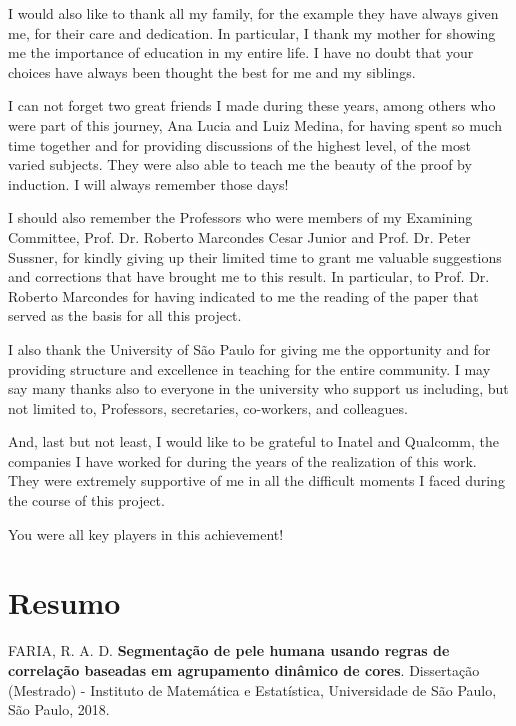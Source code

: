 \documentclass[12pt,twoside,a4paper]{book}
\theoremstyle{plain}
\theoremstyle{definition}
\begin{document}
I would also like to thank all my family, for the example they have always given me, for their care and dedication. In particular, I thank my mother for showing me the importance of education in my entire life. I have no doubt that your choices have always been thought the best for me and my siblings.

I can not forget two great friends I made during these years, among others who were part of this journey, Ana Lucia and Luiz Medina, for having spent so much time together and for providing discussions of the highest level, of the most varied subjects. They were also able to teach me the beauty of the proof by induction. I will always remember those days!

I should also remember the Professors who were members of my Examining Committee, Prof. Dr. Roberto Marcondes Cesar Junior and Prof. Dr. Peter Sussner, for kindly giving up their limited time to grant me valuable suggestions and corrections that have brought me to this result. In particular, to Prof. Dr. Roberto Marcondes for having indicated to me the reading of the paper that served as the basis for all this project.

I also thank the University of São Paulo for giving me the opportunity and for providing structure and excellence in teaching for the entire community. I may say many thanks also to everyone in the university who support us including, but not limited to, Professors, secretaries, co-workers, and colleagues.

And, last but not least, I would like to be grateful to Inatel and Qualcomm, the companies I have worked for during the years of the realization of this work. They were extremely supportive of me in all the difficult moments I faced during the course of this project.

You were all key players in this achievement!


\chapter*{Resumo}

\noindent FARIA, R. A. D. \textbf{Segmentação de pele humana usando regras de correlação baseadas em agrupamento dinâmico de cores}.
Dissertação (Mestrado) - Instituto de Matemática e Estatística,
Universidade de São Paulo, São Paulo, 2018.
\\
\end{document}
